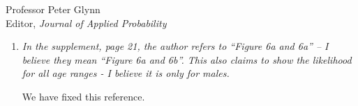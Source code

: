 \documentclass[11pt]{letter} %
\begin{document}
\begin{letter}{Professor
	Peter Glynn\\
	Editor, {\em Journal of Applied Probability}}
\begin{enumerate}
\begin{enumerate}
		We have removed this and simply state the SEIR parameter values ($\beta = 1.2, \gamma = 0.15, \sigma = 0.3$) underlying the Figure.

		\item {\it In the supplement, page 21, the author refers to “Figure 6a and 6a” – I believe they mean “Figure 6a and 6b”. This also claims to show the likelihood for all age ranges - I believe it is only for males.}
		\vspace{5mm}

		We have fixed this reference.

	\end{enumerate}
\end{enumerate}

\end{letter}
\end{document}
